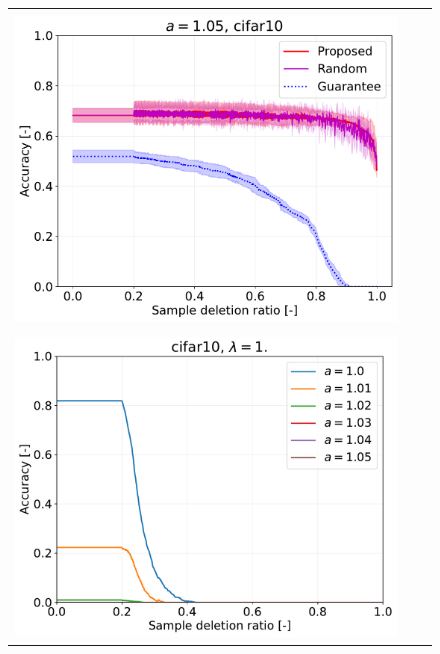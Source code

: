 \begin{figure}[H]
\begin{tabular}{ccc}
\begin{minipage}[b]{0.3\hsize}\centering {\small Dataset: CIFAR10, $\lambda=n$}\\\includegraphics[width=0.8\hsize]{fig/table_logistic/cifar10-logistic/cntk/lam_1000/a1.05000.pdf}\end{minipage}
\\
\begin{minipage}[b]{0.3\hsize}\centering {\small Dataset: CIFAR10, $\lambda=n \cdot 10^{-3}$}\\\includegraphics[width=0.8\hsize]{fig/table_logistic/cifar10-logistic/cntk/cntk_ss_screening_rate_lam1._x_n_y_etest.pdf}\end{minipage}
&

\end{tabular}
\end{figure}
